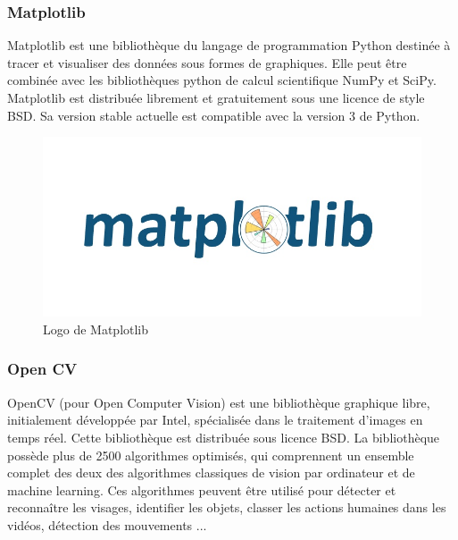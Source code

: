 \documentclass[12pt, openany]{report}
\begin{document}
\subsubsection{Matplotlib}

Matplotlib est une bibliothèque du langage de programmation Python destinée à tracer et visualiser des données sous formes de graphiques. Elle peut être combinée avec les bibliothèques python de calcul scientifique NumPy et SciPy. Matplotlib est distribuée librement et gratuitement sous une licence de style BSD. Sa version stable actuelle est compatible avec la version 3 de Python.

\begin{figure}[H]
\centering
\includegraphics[scale=0.35]{matplot.jpg}
\caption{Logo de Matplotlib}
\end{figure}

\subsubsection{Open CV}

OpenCV (pour Open Computer Vision) est une bibliothèque graphique libre, initialement développée par Intel, spécialisée dans le traitement d'images en temps réel. Cette bibliothèque est distribuée sous licence BSD.
La bibliothèque possède plus de 2500 algorithmes optimisés, qui comprennent un ensemble complet des deux des algorithmes classiques de vision par ordinateur et de machine learning. Ces algorithmes peuvent être utilisé pour détecter et reconnaître les visages, identifier les objets, classer les actions humaines dans les vidéos, détection des mouvements ...
\end{document}
